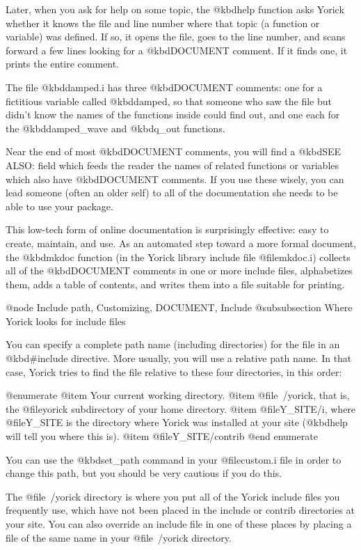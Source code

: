 {Later, when you ask for help on some topic, the @kbd{help} function
asks Yorick whether it knows the file and line number where that topic
(a function or variable) was defined.  If so, it opens the file, goes
to the line number, and scans forward a few lines looking for a
@kbd{DOCUMENT} comment.  If it finds one, it prints the entire
comment.

The file @kbd{damped.i} has three @kbd{DOCUMENT} comments: one for a
fictitious variable called @kbd{damped}, so that someone who saw the
file but didn't know the names of the functions inside could find out,
and one each for the @kbd{damped_wave} and @kbd{q_out} functions.


Near the end of most @kbd{DOCUMENT} comments, you will find a
@kbd{SEE ALSO:} field which feeds the reader the names of related
functions or variables which also have @kbd{DOCUMENT} comments.  If
you use these wisely, you can lead someone (often an older self) to
all of the documentation she needs to be able to use your package.

This low-tech form of online documentation is surprisingly effective:
easy to create, maintain, and use.  As an automated step toward a more
formal document, the @kbd{mkdoc} function (in the Yorick library include
file @file{mkdoc.i}) collects all of the @kbd{DOCUMENT} comments in one
or more include files, alphabetizes them, adds a table of contents, and
writes them into a file suitable for printing.


@node Include path, Customizing, DOCUMENT, Include
@subsubsection Where Yorick looks for include files

You can specify a complete path name (including directories) for the
file in an @kbd{#include} directive.  More usually, you will use a
relative path name.  In that case, Yorick tries to find the file
relative to these four directories, in this order:

@enumerate
@item
Your current working directory.
@item
@file{~/yorick}, that is, the @file{yorick} subdirectory of your home
directory.
@item
@file{Y_SITE/i}, where @file{Y_SITE} is the directory where
Yorick was installed at your site (@kbd{help} will tell you where
this is).
@item
@file{Y_SITE/contrib}
@end enumerate

You can use the @kbd{set_path} command in your @file{custom.i} file
in order to change this path, but you should be very cautious if you
do this.

The @file{~/yorick} directory is where you put all of the Yorick
include files you frequently use, which have not been placed in the
include or contrib directories at your site.  You can also override an
include file in one of these places by placing a file of the same name
in your @file{~/yorick} directory.


}
